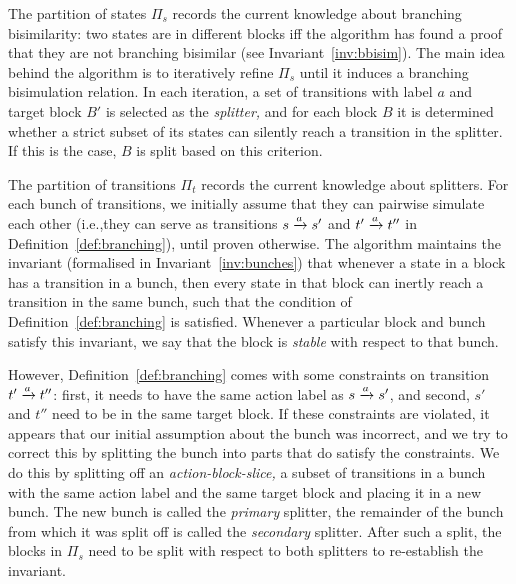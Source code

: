 \documentclass[a4paper,10pt]{article}
\theoremstyle{definition}
\theoremstyle{plain}
\newcommand{\pijl}[1]{\mathrel{\text{$\xrightarrow{\smash[t]{#1}}$}}}
\begin{document}
The partition of states $\Pi_s$ records the current knowledge about branching bisimilarity:
two states are in different blocks iff the algorithm has found a proof that they are not branching bisimilar
(see Invariant~\ref{inv:bbisim}).
The main idea behind the algorithm is to iteratively refine $\Pi_s$
until it induces a branching bisimulation relation.
In each iteration, a set of transitions with label $a$ and target block $B'$ is selected as the \emph{splitter,}
and for each block $B$ it is determined whether a strict subset of its states can silently reach a transition in the splitter.
If this is the case, $B$ is split based on this criterion.

The partition of transitions $\Pi_t$ records the current knowledge about splitters.
For each bunch of transitions, we initially assume that they can pairwise simulate each other (i.e.,\@ they can serve as transitions $s \pijl{a} s'$ and $t' \pijl{a} t''$ in Definition~\ref{def:branching}), until proven otherwise.
The algorithm maintains the invariant (formalised in Invariant~\ref{inv:bunches}) that
whenever a state in a block has a transition in a bunch,
then every state in that block can inertly reach a transition in the same bunch,
such that the condition of Definition~\ref{def:branching} is satisfied.
Whenever a particular block and bunch satisfy this invariant,
we say that the block is \emph{stable} with respect to that bunch.

However, Definition~\ref{def:branching} comes with some constraints on transition $t' \pijl{a} t''$:
first, it needs to have the same action label as $s \pijl{a} s'$,
and second, $s'$ and $t''$ need to be in the same target block.
If these constraints are violated,
it appears that our initial assumption about the bunch was incorrect,
and we try to correct this by splitting the bunch into parts
that do satisfy the constraints.
We do this by splitting off an \emph{action-block-slice,} a subset of transitions in a bunch with the same action label and the same target block and placing it in a new bunch.
The new bunch is called the \emph{primary} splitter,
the remainder of the bunch from which it was split off is called the \emph{secondary} splitter.
After such a split, the blocks in $\Pi_s$ need to be split with respect to both splitters to re-establish the invariant.
\end{document}
